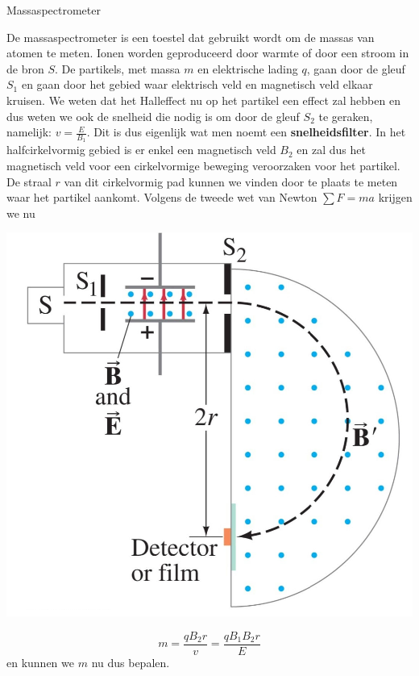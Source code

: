 
\begin{app}[Massaspectrometer]{Massaspectrometer}
    \vspace{-0.15cm}
    \begin{minipage}{.7\textwidth}
        De massaspectrometer is een toestel dat gebruikt wordt om de massas van atomen te meten.
        Ionen worden geproduceerd door warmte of door een stroom in de bron $S$.  De partikels, met massa $m$ en elektrische lading $q$, 
        gaan door de gleuf $S_{1}$ en gaan door het gebied waar elektrisch veld en magnetisch veld elkaar kruisen. We weten dat 
        het Halleffect nu op het partikel een effect zal hebben en dus weten we ook de snelheid die nodig is om door de gleuf $S_{2}$ 
        te geraken, namelijk: $v = \tfrac{E}{B_{1}}$. Dit is dus eigenlijk wat men noemt een \textbf{snelheidsfilter}. 
        In het halfcirkelvormig gebied is er enkel een magnetisch veld $B_{2}$ en zal dus het magnetisch veld voor een cirkelvormige beweging veroorzaken voor het partikel. 
        De straal $r$ van dit cirkelvormig pad kunnen we vinden door te plaats te meten waar het partikel aankomt. Volgens de tweede wet van Newton $\sum F = ma$ krijgen we nu 
    \end{minipage}
    \begin{minipage}{.28\textwidth}
        \vspace{-0.25cm}
        \includegraphics[scale = 0.5]{Images/Magnetisme/Massaspectrometer.png}
    \end{minipage}
    \vspace{0.15cm}

    \begin{equation*}
        m = \dfrac{qB_{2}r}{v} = \dfrac{qB_{1}B_{2}r}{E}
    \end{equation*}
    en kunnen we $m$ nu dus bepalen.
\end{app}